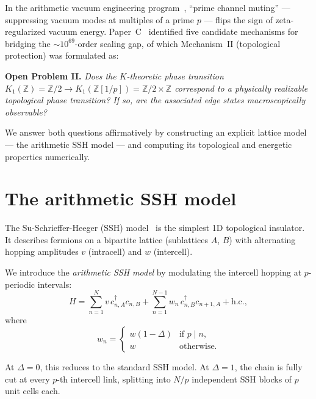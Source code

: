 \documentclass[11pt,a4paper]{article}
\newcommand{\Zp}{\mathbb{Z}[1/p]}
\begin{document}
In the arithmetic vacuum engineering program~\cite{paper_A,paper_B,paper_C},
``prime channel muting'' --- suppressing vacuum modes at multiples
of a prime $p$ --- flips the sign of zeta-regularized vacuum energy.
Paper~C~\cite{paper_C} identified five candidate mechanisms for
bridging the $\sim 10^{69}$-order scaling gap, of which
Mechanism~II (topological protection) was formulated as:

\textbf{Open Problem II.}
\textit{Does the $K$-theoretic phase transition
$K_1(\mathbb{Z}) = \mathbb{Z}/2 \to K_1(\Zp) = \mathbb{Z}/2 \times \mathbb{Z}$
correspond to a physically realizable topological phase transition?
If so, are the associated edge states macroscopically observable?}

We answer both questions affirmatively by constructing an explicit
lattice model --- the arithmetic SSH model --- and computing its
topological and energetic properties numerically.

\section{The arithmetic SSH model}
\label{sec:model}

The Su-Schrieffer-Heeger (SSH) model~\cite{SSH1979} is the simplest
1D topological insulator. It describes fermions on a bipartite
lattice (sublattices $A$, $B$) with alternating hopping
amplitudes $v$ (intracell) and $w$ (intercell).

We introduce the \emph{arithmetic SSH model} by modulating
the intercell hopping at $p$-periodic intervals:
\begin{equation}
  H = \sum_{n=1}^{N} v\, c^\dagger_{n,A} c_{n,B}
    + \sum_{n=1}^{N-1} w_n\, c^\dagger_{n,B} c_{n+1,A}
    + \mathrm{h.c.},
\end{equation}
where
\begin{equation}
  w_n = \begin{cases}
    w(1 - \Delta) & \text{if } p \mid n, \\
    w & \text{otherwise.}
  \end{cases}
  \label{eq:modulation}
\end{equation}

At $\Delta = 0$, this reduces to the standard SSH model.
At $\Delta = 1$, the chain is fully cut at every $p$-th
intercell link, splitting into $N/p$ independent SSH blocks
of $p$ unit cells each.
\end{document}

